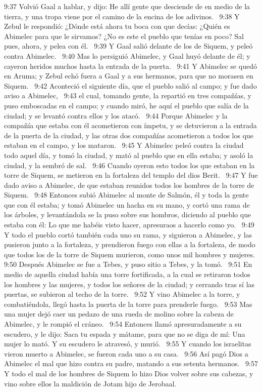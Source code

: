 9:37 Volvió Gaal a hablar, y dijo: He allí gente que desciende de en medio de la tierra, y una tropa viene por el camino de la encina de los adivinos.  
9:38 Y Zebul le respondió: ¿Dónde está ahora tu boca con que decías: ¿Quién es Abimelec para que le sirvamos? ¿No es este el pueblo que tenías en poco? Sal pues, ahora, y pelea con él.  
9:39 Y Gaal salió delante de los de Siquem, y peleó contra Abimelec.  
9:40 Mas lo persiguió Abimelec, y Gaal huyó delante de él; y cayeron heridos muchos hasta la entrada de la puerta.  
9:41 Y Abimelec se quedó en Aruma; y Zebul echó fuera a Gaal y a sus hermanos, para que no morasen en Siquem.  
9:42 Aconteció el siguiente día, que el pueblo salió al campo; y fue dado aviso a Abimelec,  
9:43 el cual, tomando gente, la repartió en tres compañías, y puso emboscadas en el campo; y cuando miró, he aquí el pueblo que salía de la ciudad; y se levantó contra ellos y los atacó.  
9:44 Porque Abimelec y la compañía que estaba con él acometieron con ímpetu, y se detuvieron a la entrada de la puerta de la ciudad, y las otras dos compañías acometieron a todos los que estaban en el campo, y los mataron.  
9:45 Y Abimelec peleó contra la ciudad todo aquel día, y tomó la ciudad, y mató al pueblo que en ella estaba; y asoló la ciudad, y la sembró de sal.  
9:46 Cuando oyeron esto todos los que estaban en la torre de Siquem, se metieron en la fortaleza del templo del dios Berit.  
9:47 Y fue dado aviso a Abimelec, de que estaban reunidos todos los hombres de la torre de Siquem.  
9:48 Entonces subió Abimelec al monte de Salmón, él y toda la gente que con él estaba; y tomó Abimelec un hacha en su mano, y cortó una rama de los árboles, y levantándola se la puso sobre sus hombros, diciendo al pueblo que estaba con él: Lo que me habéis visto hacer, apresuraos a hacerlo como yo.  
9:49 Y todo el pueblo cortó también cada uno su rama, y siguieron a Abimelec, y las pusieron junto a la fortaleza, y prendieron fuego con ellas a la fortaleza, de modo que todos los de la torre de Siquem murieron, como unos mil hombres y mujeres.  
9:50 Después Abimelec se fue a Tebes, y puso sitio a Tebes, y la tomó.  
9:51 En medio de aquella ciudad había una torre fortificada, a la cual se retiraron todos los hombres y las mujeres, y todos los señores de la ciudad; y cerrando tras sí las puertas, se subieron al techo de la torre.  
9:52 Y vino Abimelec a la torre, y combatiéndola, llegó hasta la puerta de la torre para prenderle fuego.  
9:53 Mas una mujer dejó caer un pedazo de una rueda de molino sobre la cabeza de Abimelec, y le rompió el cráneo.  
9:54 Entonces llamó apresuradamente a su escudero, y le dijo: Saca tu espada y mátame, para que no se diga de mí: Una mujer lo mató. Y su escudero le atravesó, y murió.  
9:55 Y cuando los israelitas vieron muerto a Abimelec, se fueron cada uno a su casa.  
9:56 Así pagó Dios a Abimelec el mal que hizo contra su padre, matando a sus setenta hermanos.  
9:57 Y todo el mal de los hombres de Siquem lo hizo Dios volver sobre sus cabezas, y vino sobre ellos la maldición de Jotam hijo de Jerobaal.  
